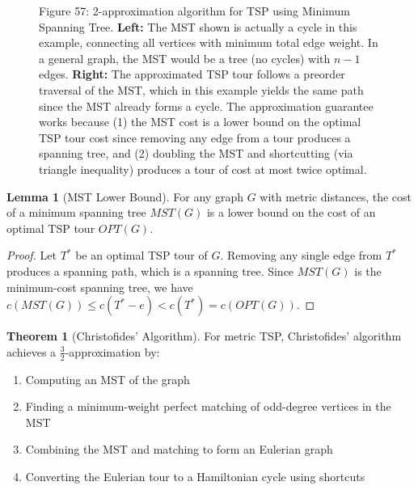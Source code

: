 \documentclass{article}
\theoremstyle{definition}
\newtheorem{theorem}{Theorem}
\newtheorem{lemma}{Lemma}
\begin{document}
\begin{figure}[h]
\begin{center}
\begin{center}
\small Figure 57: 2-approximation algorithm for TSP using Minimum Spanning Tree. \textbf{Left:} The MST shown is actually a cycle in this example, connecting all vertices with minimum total edge weight. In a general graph, the MST would be a tree (no cycles) with $n-1$ edges. \textbf{Right:} The approximated TSP tour follows a preorder traversal of the MST, which in this example yields the same path since the MST already forms a cycle. The approximation guarantee works because (1) the MST cost is a lower bound on the optimal TSP tour cost since removing any edge from a tour produces a spanning tree, and (2) doubling the MST and shortcutting (via triangle inequality) produces a tour of cost at most twice optimal.
\end{center}\end{center}
\label{fig:tsp-approx}
\end{figure}

\begin{lemma}[MST Lower Bound]
For any graph $G$ with metric distances, the cost of a minimum spanning tree $MST(G)$ is a lower bound on the cost of an optimal TSP tour $OPT(G)$.
\end{lemma}

\begin{proof}
Let $T^*$ be an optimal TSP tour of $G$. Removing any single edge from $T^*$ produces a spanning path, which is a spanning tree. Since $MST(G)$ is the minimum-cost spanning tree, we have $c(MST(G)) \leq c(T^* - e) < c(T^*) = c(OPT(G))$.
\end{proof}

\begin{theorem}[Christofides' Algorithm]
For metric TSP, Christofides' algorithm achieves a $\frac{3}{2}$-approximation by:
\begin{enumerate}
    \item Computing an MST of the graph
    \item Finding a minimum-weight perfect matching of odd-degree vertices in the MST
    \item Combining the MST and matching to form an Eulerian graph
    \item Converting the Eulerian tour to a Hamiltonian cycle using shortcuts
\end{enumerate}
\end{theorem}
\end{document}
